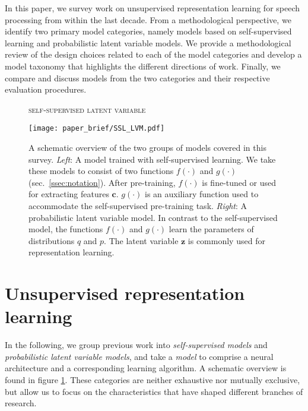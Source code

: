 In this paper, we survey work on unsupervised representation learning for speech processing from within the last decade.
From a methodological perspective, we identify two primary model categories, namely models based on self-supervised learning and probabilistic latent variable models. 
We provide a methodological review of the design choices related to each of the model categories and develop a model taxonomy that highlights the different directions of work. Finally, we compare and discuss models from the two categories and their respective evaluation procedures.

\begin{figure}[!t]
    \begin{flushleft}
        \textsc{\small \hspace{0.16\textwidth} self-supervised \hspace{0.22\textwidth} latent variable}
    \end{flushleft}
    \centering
    \texttt{[image: paper\_brief/SSL\_LVM.pdf]}
    \caption{A schematic overview of the two groups of models covered in this survey. \textit{Left}: A model trained with self-supervised learning. We take these models to consist of two functions $f(\cdot)$ and $g(\cdot)$ (sec.~\ref{ssec:notation}). After pre-training, $f(\cdot)$ is fine-tuned or used for extracting features $\mathbf{c}$. $g(\cdot)$ is an auxiliary function used to accommodate the self-supervised pre-training task. \textit{Right}: A probabilistic latent variable model. In contrast to the self-supervised model, the functions $f(\cdot)$ and $g(\cdot)$ learn the parameters of distributions $q$ and $p$. The latent variable $\mathbf{z}$ is commonly used for representation learning.}
    \label{fig:ssl_lvm}
\end{figure}

\section{Unsupervised representation learning}

In the following, we group previous work into \textit{self-supervised models} and \textit{probabilistic latent variable models}, and take a \emph{model} to comprise a neural architecture and a corresponding learning algorithm. A schematic overview is found in figure \ref{fig:ssl_lvm}. These categories are neither exhaustive nor mutually exclusive, but allow us to focus on the characteristics that have shaped different branches of research. 

